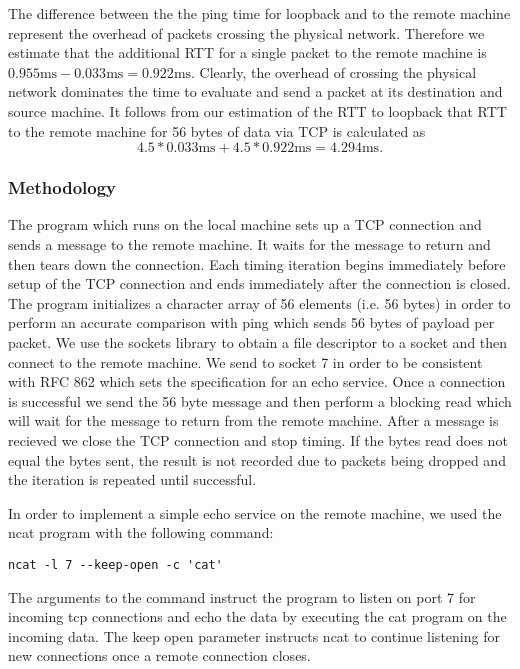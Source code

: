 The difference between the the ping time for loopback and to the remote machine
represent the overhead of packets crossing the physical network. Therefore we
estimate that the additional RTT for a single packet to the remote machine is
$0.955\text{ms} - 0.033\text{ms} = 0.922\text{ms}$. Clearly, the overhead of
crossing the physical network dominates the time to evaluate and send a packet
at its destination and source machine. It follows from our estimation of the
RTT to loopback that RTT to the remote machine for 56 bytes of data via TCP is
calculated as $$4.5 * 0.033\text{ms} + 4.5 * 0.922\text{ms} = 4.294\text{ms}.$$

\subsubsection{Methodology}

The program which runs on the local machine sets up a TCP connection and sends
a message to the remote machine. It waits for the message to return and then
tears down the connection. Each timing iteration begins immediately before
setup of the TCP connection and ends immediately after the connection is
closed. The program initializes a character array of 56 elements (i.e. 56
bytes) in order to perform an accurate comparison with ping which sends 56
bytes of payload per packet.  We use the sockets library to obtain a file
descriptor to a socket and then connect to the remote machine. We send to
socket 7 in order to be consistent with RFC 862 \cite{rfc862} which sets the
specification for an echo service. Once a connection is successful we send the
56 byte message and then perform a blocking read which will wait for the
message to return from the remote machine. After a message is recieved we close
the TCP connection and stop timing. If the bytes read does not equal the bytes
sent, the result is not recorded due to packets being dropped and the iteration
is repeated until successful.

In order to implement a simple echo service on the remote machine, we used the
ncat program with the following command: 
\begin{verbatim}
ncat -l 7 --keep-open -c 'cat'
\end{verbatim}
The arguments to the command instruct the program to listen on port 7 for
incoming tcp connections and echo the data by executing the cat program on the
incoming data. The keep open parameter instructs ncat to continue listening for
new connections once a remote connection closes.

